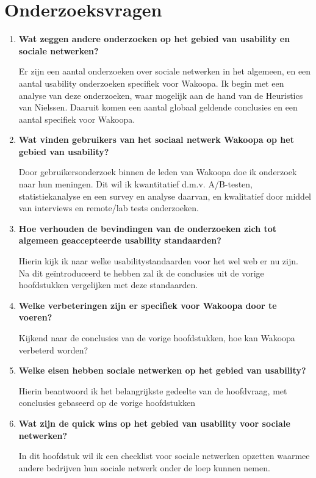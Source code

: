 \documentclass[a4paper, 10pt, pdftex]{article}
\begin{document}
\section{Onderzoeksvragen}
\begin{enumerate}
\item
 \textbf{Wat zeggen andere onderzoeken op het gebied van usability en sociale netwerken?}

Er zijn een aantal onderzoeken over sociale netwerken in het algemeen, en een aantal usability onderzoeken specifiek voor Wakoopa. Ik begin met een analyse van deze onderzoeken, waar mogelijk aan de hand van de Heuristics van Nielssen. Daaruit komen een aantal globaal geldende conclusies en een aantal specifiek voor Wakoopa.

\item
\textbf{Wat vinden gebruikers van het sociaal netwerk Wakoopa op het gebied van usability?}

Door gebruikersonderzoek binnen de leden van Wakoopa doe ik onderzoek naar hun meningen. Dit wil ik kwantitatief d.m.v. A/B-testen, statistiekanalyse en een survey en analyse daarvan, en kwalitatief door middel van interviews en remote/lab tests onderzoeken.

\item
\textbf{Hoe verhouden de bevindingen van de onderzoeken zich tot algemeen geaccepteerde usability standaarden?}

Hierin kijk ik naar welke usabilitystandaarden voor het wel web er nu zijn. Na dit ge\"{i}ntroduceerd te hebben zal ik de conclusies uit de vorige hoofdstukken vergelijken met deze standaarden.

\item
\textbf{Welke verbeteringen zijn er specifiek voor Wakoopa door te voeren?}

Kijkend naar de conclusies van de vorige hoofdstukken, hoe kan Wakoopa verbeterd worden?

\item
\textbf{Welke eisen hebben sociale netwerken op het gebied van usability?}

Hierin beantwoord ik het belangrijkste gedeelte van de hoofdvraag, met conclusies gebaseerd op de vorige hoofdstukken

\item
\textbf{Wat zijn de quick wins op het gebied van usability voor sociale netwerken?}

In dit hoofdstuk wil ik een checklist voor sociale netwerken opzetten waarmee andere bedrijven hun sociale netwerk onder de loep kunnen nemen.
\end{enumerate}
\end{document}
